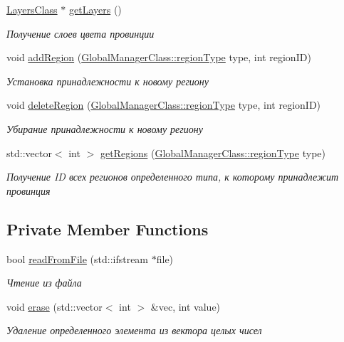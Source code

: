 \begin{DoxyCompactItemize}
\hyperlink{class_layers_class}{Layers\+Class} $\ast$ \hyperlink{class_prov_class_a49e9acf6093021eb11d116c847e07689}{get\+Layers} ()
\begin{DoxyCompactList}\small\item\em Получение слоев цвета провинции \end{DoxyCompactList}\item 
void \hyperlink{class_prov_class_abb94b660b07d0b328ebf9f0dff0bf2f4}{add\+Region} (\hyperlink{class_global_manager_class_a794b4a5298c61f8d25d9da44b7826857}{Global\+Manager\+Class\+::region\+Type} type, int region\+ID)
\begin{DoxyCompactList}\small\item\em Установка принадлежности к новому региону \end{DoxyCompactList}\item 
void \hyperlink{class_prov_class_a89202c5501d165a556f577b5a6742b58}{delete\+Region} (\hyperlink{class_global_manager_class_a794b4a5298c61f8d25d9da44b7826857}{Global\+Manager\+Class\+::region\+Type} type, int region\+ID)
\begin{DoxyCompactList}\small\item\em Убирание принадлежности к новому региону \end{DoxyCompactList}\item 
std\+::vector$<$ int $>$ \hyperlink{class_prov_class_aa559d5aeecf8df6f7d1c50286575ce04}{get\+Regions} (\hyperlink{class_global_manager_class_a794b4a5298c61f8d25d9da44b7826857}{Global\+Manager\+Class\+::region\+Type} type)
\begin{DoxyCompactList}\small\item\em Получение ID всех регионов определенного типа, к которому принадлежит провинция \end{DoxyCompactList}\end{DoxyCompactItemize}
\subsection*{Private Member Functions}
\begin{DoxyCompactItemize}
\item 
bool \hyperlink{class_prov_class_ab87fcfb3b02e5beb1e30f03059f2928b}{read\+From\+File} (std\+::ifstream $\ast$file)
\begin{DoxyCompactList}\small\item\em Чтение из файла \end{DoxyCompactList}\item 
void \hyperlink{class_prov_class_a7da473dcff63f556364ec6f5c1d94442}{erase} (std\+::vector$<$ int $>$ \&vec, int value)
\begin{DoxyCompactList}\small\item\em Удаление определенного элемента из вектора целых чисел \end{DoxyCompactList}\end{DoxyCompactItemize}
